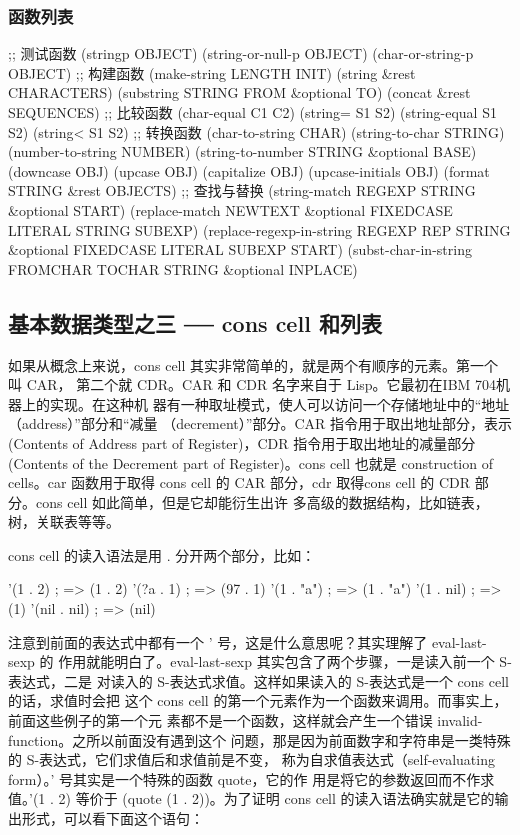 \documentclass[11pt]{ctexart}
\begin{document}
\subsubsection{函数列表}
\label{sec:org59546f0}
;; 测试函数
(stringp OBJECT)
(string-or-null-p OBJECT)
(char-or-string-p OBJECT)
;; 构建函数
(make-string LENGTH INIT)
(string \&rest CHARACTERS)
(substring STRING FROM \&optional TO)
(concat \&rest SEQUENCES)
;; 比较函数
(char-equal C1 C2)
(string= S1 S2)
(string-equal S1 S2)
(string< S1 S2)
;; 转换函数
(char-to-string CHAR)
(string-to-char STRING)
(number-to-string NUMBER)
(string-to-number STRING \&optional BASE)
(downcase OBJ)
(upcase OBJ)
(capitalize OBJ)
(upcase-initials OBJ)
(format STRING \&rest OBJECTS)
;; 查找与替换
(string-match REGEXP STRING \&optional START)
(replace-match NEWTEXT \&optional FIXEDCASE LITERAL STRING SUBEXP)
(replace-regexp-in-string REGEXP REP STRING \&optional FIXEDCASE LITERAL SUBEXP START)
(subst-char-in-string FROMCHAR TOCHAR STRING \&optional INPLACE)
\subsection{基本数据类型之三 ── cons cell 和列表}
\label{sec:orgb187278}
如果从概念上来说，cons cell 其实非常简单的，就是两个有顺序的元素。第一个叫 CAR，
第二个就 CDR。CAR 和 CDR 名字来自于 Lisp。它最初在IBM 704机器上的实现。在这种机
器有一种取址模式，使人可以访问一个存储地址中的“地址（address）”部分和“减量
（decrement）”部分。CAR 指令用于取出地址部分，表示(Contents of Address part of
Register)，CDR 指令用于取出地址的减量部分(Contents of the Decrement part of
Register)。cons cell 也就是 construction of cells。car 函数用于取得 cons cell 的
CAR 部分，cdr 取得cons cell 的 CDR 部分。cons cell 如此简单，但是它却能衍生出许
多高级的数据结构，比如链表，树，关联表等等。

cons cell 的读入语法是用 . 分开两个部分，比如：

'(1 . 2)                                ; => (1 . 2)
'(?a . 1)                               ; => (97 . 1)
'(1 . "a")                              ; => (1 . "a")
'(1 . nil)                              ; => (1)
'(nil . nil)                            ; => (nil)

注意到前面的表达式中都有一个 ' 号，这是什么意思呢？其实理解了 eval-last-sexp 的
作用就能明白了。eval-last-sexp 其实包含了两个步骤，一是读入前一个 S-表达式，二是
对读入的 S-表达式求值。这样如果读入的 S-表达式是一个 cons cell 的话，求值时会把
这个 cons cell 的第一个元素作为一个函数来调用。而事实上，前面这些例子的第一个元
素都不是一个函数，这样就会产生一个错误 invalid-function。之所以前面没有遇到这个
问题，那是因为前面数字和字符串是一类特殊的 S-表达式，它们求值后和求值前是不变，
称为自求值表达式（self-evaluating form）。' 号其实是一个特殊的函数 quote，它的作
用是将它的参数返回而不作求值。'(1 . 2) 等价于 (quote (1 . 2))。为了证明 cons
cell 的读入语法确实就是它的输出形式，可以看下面这个语句：
\end{document}
